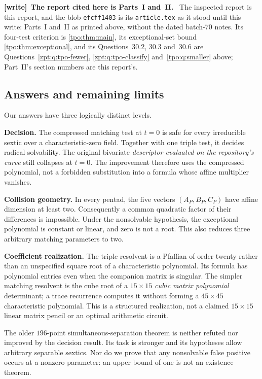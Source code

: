 \documentclass[11pt,letterpaper]{article}
\numberwithin{equation}{section}
\theoremstyle{definition}
\theoremstyle{remark}
\newcommand{\src}[1]{\texttt{\nolinkurl{#1}}}
\newenvironment{writenote}[1][]{\par\smallskip\begingroup\small
 \noindent\textbf{[write]}\if\relax\detokenize{#1}\relax\else~\textbf{#1.}\fi\ }%
 {\par\endgroup\smallskip}
\begin{document}
\begin{writenote}[The report cited here is Parts~I and~II]
The inspected report \cite{zpt:repo-report} is this report, and the blob
\src{efcff1403} is its \src{article.tex} as it stood until this write:
Parts~I and~II as printed above, without the dated batch-70 notes. Its
four-test criterion is \cref{tpo:thm:main}, its exceptional-set bound
\cref{tpo:thm:exceptional}, and its Questions~30.2, 30.3 and~30.6 are
Questions~\ref{zpt:q:tpo-fewer}, \ref{zpt:q:tpo-classify}
and~\ref{tpo:q:smaller} above; Part~II's section numbers are this report's.
\end{writenote}

\subsection{Answers and remaining limits}
Our answers have three logically distinct levels.

\textbf{Decision.} The compressed matching test at $t=0$ is safe for every
irreducible sextic over a characteristic-zero field. Together with one
triple test, it decides radical solvability. The original bivariate
\emph{descriptor evaluated on the repository's curve} still collapses at
$t=0$. The improvement therefore uses the compressed polynomial, not a
forbidden substitution into a formula whose affine multiplier vanishes.

\textbf{Collision geometry.} In every pentad, the five vectors
$(A_P,B_P,C_P)$ have affine dimension at least two. Consequently a common
quadratic factor of their differences is impossible. Under the nonsolvable
hypothesis, the exceptional polynomial is constant or linear, and zero is
not a root. This also reduces three arbitrary matching parameters to two.

\textbf{Coefficient realization.} The triple resolvent is a Pfaffian of
order twenty rather than an unspecified square root of a characteristic
polynomial. Its formula has polynomial entries even when the companion
matrix is singular. The simpler matching resolvent is the cube root of a
$15\times15$ \emph{cubic matrix polynomial} determinant; a trace recurrence
computes it without forming a $45\times45$ characteristic polynomial.
This is a structured realization, not a claimed $15\times15$ linear matrix
pencil or an optimal arithmetic circuit.

The older $196$-point simultaneous-separation theorem is neither refuted nor
improved by the decision result. Its task is stronger and its hypotheses
allow arbitrary separable sextics. Nor do we prove that any nonsolvable
false positive occurs at a nonzero parameter: an upper bound of one is not
an existence theorem.
\end{document}
